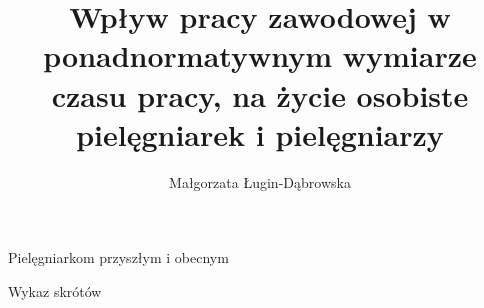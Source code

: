 \documentclass[a4paper,12pt,twoside,openright]{mwrep}
\title{Wpływ pracy zawodowej w ponadnormatywnym wymiarze czasu pracy, na życie osobiste pielęgniarek i pielęgniarzy}
\author{Małgorzata Ługin-Dąbrowska}
\newcommand{\nocontentsline}[3]{}
\newcommand{\tocless}[2]{\bgroup\let\addcontentsline=\nocontentsline#1{#2}\egroup}
\begin{document}
\sloppy
\maketitle

\newpage

\centerline{Pielęgniarkom przyszłym i obecnym}

\tableofcontents


\newpage
\Large Wykaz skrótów
\normalsize

\end{document}
